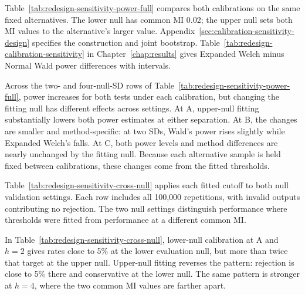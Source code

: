 Table~\ref{tab:redesign-sensitivity-power-full} compares both calibrations
on the same fixed alternatives. The lower null has common MI 0.02;
the upper null sets both MI values to the alternative's larger value.
Appendix~\ref{sec:calibration-sensitivity-design} specifies the construction
and joint bootstrap. Table~\ref{tab:redesign-calibration-sensitivity}
in Chapter~\ref{chap:results} gives Expanded Welch minus Normal Wald
power differences with intervals.

\begin{table}[!htbp]
\centering
\small
\caption{Power for fixed alternatives under lower- and upper-null calibration.}
\label{tab:redesign-sensitivity-power-full}

\end{table}

Across the two- and four-null-SD rows of Table~\ref{tab:redesign-sensitivity-power-full},
power increases for both tests under
each calibration, but changing the fitting null has different effects
across settings. At A, upper-null fitting substantially lowers both
power estimates at either separation. At B, the changes are smaller
and method-specific: at two SDs, Wald's power rises slightly while
Expanded Welch's falls. At C, both power levels and method differences
are nearly unchanged by the fitting null. Because each alternative
sample is held fixed between calibrations, these changes come from
the fitted thresholds.

\begin{samepage}
Table~\ref{tab:redesign-sensitivity-cross-null} applies each fitted cutoff
to both null validation settings. Each row includes all 100,000
repetitions, with invalid outputs contributing no rejection. The two null
settings distinguish performance where thresholds were fitted from
performance at a different common MI.
\par
\end{samepage}

\begin{table}[H]
\centering
\small
\setlength{\tabcolsep}{3pt}
\caption{Independent null validation under both fitted calibrations.}
\label{tab:redesign-sensitivity-cross-null}

\end{table}

In Table~\ref{tab:redesign-sensitivity-cross-null}, lower-null calibration
at A and \(h=2\) gives rates close to 5\% at
the lower evaluation null, but more than twice that target at the upper
null. Upper-null fitting reverses the pattern: rejection is close to 5\%
there and conservative at the lower null. The same pattern is stronger
at \(h=4\), where the two common MI values are farther apart.

